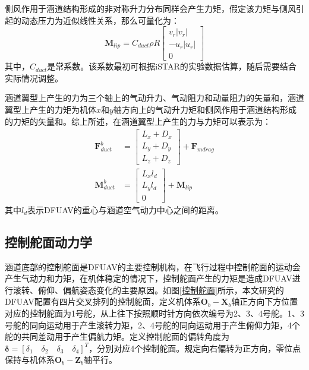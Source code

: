 侧风作用于涵道结构形成的非对称升力分布同样会产生力矩，假定该力矩与侧风引起的动态压力为近似线性关系，那么可量化为：
\begin{equation}
    \boldsymbol{M}_{lip}=C_{duct}\rho{R}
    \begin{bmatrix}v_r|v_r| \\-u_r|u_r| \\0\end{bmatrix}
    \label{eq_33}
\end{equation}
其中，$C_{duct}$是常系数。该系数最初可根据iSTAR\cite{fleming2003improving}的实验数据估算，随后需要结合实际情况调整。

涵道翼型上产生的力为三个轴上的气动升力、气动阻力和动量阻力的矢量和，涵道翼型上产生的力矩为机体$x$和$y$轴方向上的气动升力矩和侧风作用于涵道结构形成的力矩的矢量和\cite{johnsonModelingControlFlight2006b,choiStaticAnalysisSmall2012}。综上所述，在涵道翼型上产生的力与力矩可以表示为：
\begin{align}
    \boldsymbol{F}_{duct}^b&=
    \begin{bmatrix}
    L_x+D_x \\
    L_y+D_y \\
    L_z+D_z
    \end{bmatrix}+\boldsymbol{F} _{mdrag}\label{eq_33.5}\\
    \boldsymbol{M}_{duct}^b&=
    \begin{bmatrix}
    L_xl_d \\
    L_yl_d \\
    0
    \end{bmatrix}+\boldsymbol{M}_{lip}
    \label{eq_34}
\end{align}
其中$l_d$表示DFUAV的重心与涵道空气动力中心之间的距离。

\subsection{控制舵面动力学}

涵道底部的控制舵面是DFUAV的主要控制机构，在飞行过程中控制舵面的运动会产生气动力和力矩，在机体稳定的情况下，控制舵面产生的力矩是造成DFUAV进行滚转、俯仰、偏航姿态变化的主要原因。如图\ref{控制舵面}所示，本文研究的DFUAV配置有四片交叉排列的控制舵面，定义机体系${\boldsymbol{O}_b}-{\boldsymbol{X}_b}$轴正方向下方位置对应的控制舵面为1号舵，从上往下按照顺时针方向依次编号为2、3、4号舵。1、3号舵的同向运动用于产生滚转力矩，2、4号舵的同向运动用于产生俯仰力矩，4个舵的共同差动用于产生偏航力矩。定义控制舵面的偏转角度为$\boldsymbol{\delta}=[\delta_1\quad\delta_2\quad\delta_3\quad\delta_4]^T$，分别对应4个控制舵面。规定向右偏转为正方向，零位点保持与机体系${\boldsymbol{O}_b}-{\boldsymbol{Z}_b}$轴平行。

